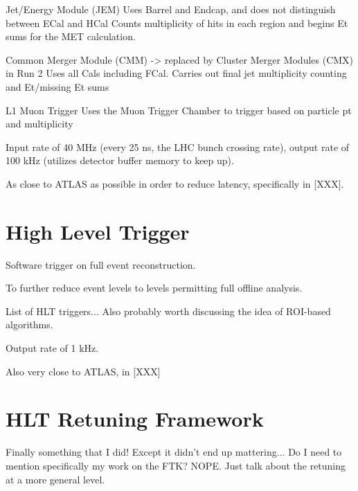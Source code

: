     Jet/Energy Module (JEM)
        Uses Barrel and Endcap, and does not distinguish between ECal and HCal
        Counts multiplicity of hits in each region and begins Et sums for the MET calculation.
        
    Common Merger Module (CMM) -> replaced by Cluster Merger Modules (CMX) in Run 2
        Uses all Cals including FCal.
        Carries out final jet multiplicity counting and Et/missing Et sums

L1 Muon Trigger
    Uses the Muon Trigger Chamber %
    to trigger based on particle pt and multiplicity




Input rate of 40 MHz (every 25 ns, the LHC bunch crossing rate), output rate of 100 kHz (utilizes detector buffer memory to keep up). \cite{trigger_run2}

As close to ATLAS as possible in order to reduce latency, specifically in [XXX].



\section{High Level Trigger}

Software trigger on full event reconstruction.

To further reduce event levels to levels permitting full offline analysis.

List of HLT triggers...
Also probably worth discussing the idea of ROI-based algorithms.

Output rate of 1 kHz.

Also very close to ATLAS, in [XXX]



\section{HLT Retuning Framework}
Finally something that I did!
Except it didn't end up mattering...
Do I need to mention specifically my work on the FTK? NOPE. Just talk about the retuning at a more general level.

